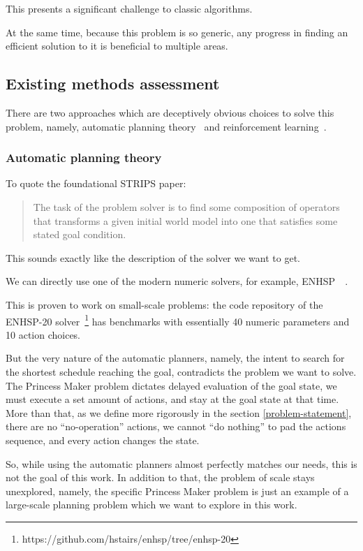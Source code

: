 \documentclass[12pt, a4paper]{article}
\begin{document}
	This presents a significant challenge to classic algorithms.
	
	At the same time, because this problem is so generic, any progress in finding an efficient solution to it is beneficial to multiple areas.
	
	\subsection{Existing methods assessment}\label{introduction:assessment}

	There are two approaches which are deceptively obvious choices to solve this problem, namely, automatic planning theory~\cite{fikes1971strips} and reinforcement learning~\cite{sutton2018reinforcement}.
	
  \subsubsection{Automatic planning theory}
  
  To quote the foundational STRIPS paper:
  
  \blockcquote[p.~190]{fikes1971strips}
  {The task of the problem solver is to find some composition of operators that transforms a given initial world model into one that satisfies some stated goal condition.}
  
  This sounds exactly like the description of the solver we want to get.
  
	We can directly use one of the modern numeric solvers, for example, ENHSP~\cite{enhsp::scala2020subgoaling}~\cite{enhsp::Scala2016IntervalBasedRF}.
	
	This is proven to work on small-scale problems: the code repository of the ENHSP-20 solver~\footnote{https://github.com/hstairs/enhsp/tree/enhsp-20} has benchmarks with essentially 40 numeric parameters and 10 action choices.
	
	But the very nature of the automatic planners, namely, the intent to search for the shortest schedule reaching the goal, contradicts the problem we want to solve.
	The Princess Maker problem dictates delayed evaluation of the goal state, we must execute a set amount of actions, and stay at the goal state at that time.
	More than that, as we define more rigorously in the section \ref{problem-statement}, there are no ``no-operation'' actions, we cannot ``do nothing'' to pad the actions sequence, and every action changes the state.
	
	So, while using the automatic planners almost perfectly matches our needs, this is not the goal of this work.
	In addition to that, the problem of scale stays unexplored, namely, the specific Princess Maker problem is just an example of a large-scale planning problem which we want to explore in this work.
\end{document}
